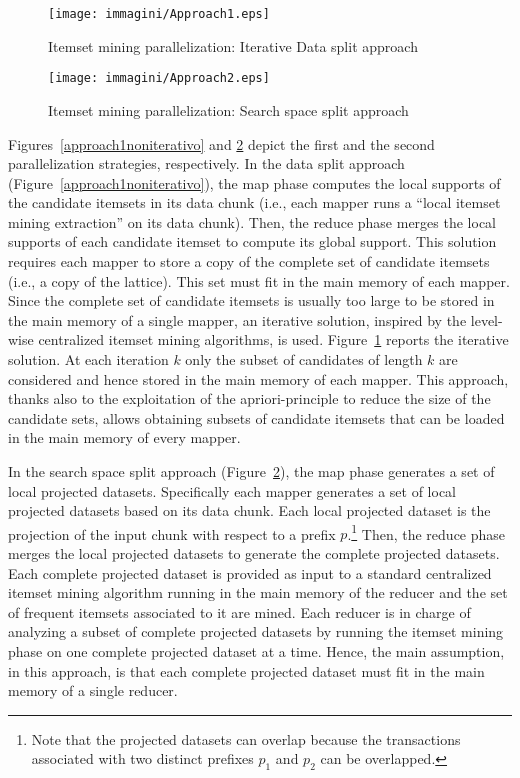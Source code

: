 \begin{figure}[!t]
\texttt{[image: immagini/Approach1.eps]}
\caption{Itemset mining parallelization: Iterative Data split approach}
\label{approach1}
\end{figure}



\begin{figure}[!t]
\texttt{[image: immagini/Approach2.eps]}
\caption{Itemset mining parallelization: Search space split approach}
\label{approach2}
\end{figure}


Figures~\ref{approach1noniterativo} and \ref{approach2} depict the first and the second parallelization strategies, respectively.  
In the data split approach (Figure~\ref{approach1noniterativo}), the map phase computes the local supports of the candidate itemsets in its data chunk  (i.e., each mapper runs a ``local itemset mining extraction'' on its data chunk). Then, the reduce phase merges the local supports of each candidate itemset to compute its global support. This solution requires each mapper to store a copy of the complete set of candidate itemsets (i.e., a copy of the lattice). 
This set must fit in the main memory of each mapper. Since the complete set of candidate itemsets is usually too large to be stored in the main memory of a single mapper, an iterative solution, inspired by the level-wise centralized itemset mining algorithms, is used. Figure~\ref{approach1} reports the iterative solution. 
At each iteration $k$ only the subset of candidates of length $k$ are considered and hence stored in the main memory of each mapper. This approach, thanks also to the exploitation of the apriori-principle to reduce the size of the candidate sets, allows obtaining subsets of candidate itemsets that can be loaded in the main memory of every mapper.

In the search space split approach (Figure~\ref{approach2}), the map phase generates a set of local projected datasets. Specifically each mapper generates a set of local projected datasets based on its data chunk. Each local projected dataset is the projection of the input chunk with respect to a prefix $p$.\footnote{Note that the projected datasets can overlap because the transactions associated with two distinct prefixes $p_1$ and $p_2$ can be overlapped.} Then, the reduce phase merges the local projected datasets to generate the complete projected datasets. Each complete projected dataset is provided as input to a standard centralized itemset mining algorithm running in the main memory of the reducer and the set of frequent itemsets associated to it are mined.
Each reducer is in charge of analyzing a subset of complete projected datasets by running the itemset mining phase on one complete projected dataset at a time.   
Hence, the main assumption, in this approach, is that each complete projected dataset must fit in the main memory of a single reducer. 


